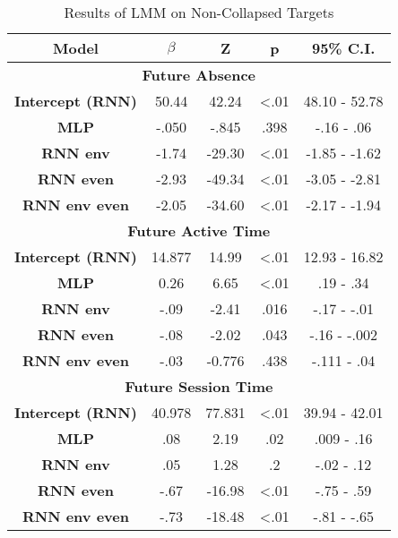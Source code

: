 \begin{table}[h]
\centering
\caption{Results of LMM on Non-Collapsed Targets}
\label{exploded_lmm_33}
\begin{tabular}{ccccc}
\hline
\textbf{Model}  & \textbf{$\beta$} & \textbf{Z} & \textbf{p} & \textbf{95\% C.I.}                  \\ \hline

\multicolumn{5}{c}{\textbf{Future Absence}}                                                                         \\ \hline
\textbf{Intercept (RNN)} & 50.44                & 42.24     & \textless .01   & 48.10 - 52.78                     \\
\textbf{MLP}           & -.050                & -.845     & .398   & -.16 - .06                     \\
\textbf{RNN env}          & -1.74                & -29.30     & \textless .01   & -1.85 - -1.62                     \\
\textbf{RNN even}            & -2.93                & -49.34    & \textless .01   & -3.05 - -2.81                     \\
\textbf{RNN env even}             & -2.05                & -34.60     & \textless .01   & -2.17 - -1.94                       \\ \hline

\multicolumn{5}{c}{\textbf{Future Active Time}}                                                                     \\ \hline
\textbf{Intercept (RNN)} & 14.877                & 14.99      & \textless .01  & 12.93 - 16.82                     \\
\textbf{MLP}           & 0.26               & 6.65    & \textless .01  & .19 - .34                     \\
\textbf{RNN env}          & -.09                & -2.41     & .016  & -.17 - -.01                     \\
\textbf{RNN even}            & -.08                & -2.02     &  .043  & -.16 - -.002                     \\
\textbf{RNN env even}             & -.03                & -0.776      &  .438  & -.111 - .04                     \\ \hline

\multicolumn{5}{c}{\textbf{Future Session Time}}                                                                     \\ \hline
\textbf{Intercept (RNN)} & 40.978                & 77.831     & \textless .01  & 39.94 - 42.01                     \\
\textbf{MLP}            & .08                & 2.19     & .02  & .009 - .16                     \\
\textbf{RNN env}          & .05               & 1.28     & .2  & -.02 - .12                     \\
\textbf{RNN even}            & -.67                & -16.98     & \textless .01  & -.75 - .59                     \\
\textbf{RNN env even}             & -.73                & -18.48      & \textless .01  & -.81 - -.65                     \\ \hline


\end{tabular}
\end{table}
